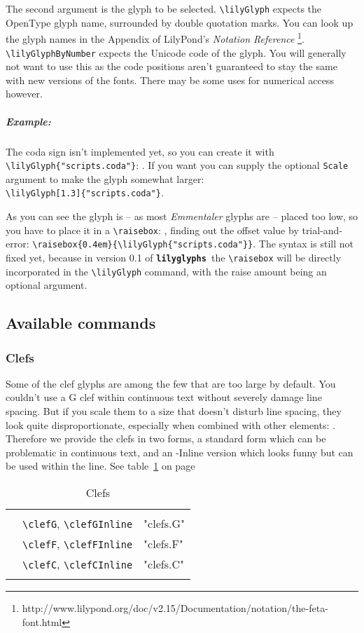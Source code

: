 \documentclass{article}
\newcommand{\lilyglyphs}{\texttt{\textbf{lilyglyphs }}}
\newcommand*{\cmd}[1]{\texttt{\textbackslash #1}}
\newcommand{\tmpCaption}{} %
\newcommand{\tmpLabel}{}
\newenvironment{reftable}[2]
	{%
		\renewcommand{\tmpCaption}{#1}
		\renewcommand{\tmpLabel}{#2}
		\begin{table}[ht]
		\begin{center}
		\begin{tabular}[t]{lll}
		\hline
		&\\
	}
	{%
		&\\
		\hline
		\end{tabular}
		\caption{\tmpCaption}
		\label{table:\tmpLabel}
		\end{center}
		\end{table}
	}
\begin{document}
The second argument is the glyph to be selected. \cmd{lilyGlyph} expects the OpenType glyph name, surrounded by double quotation marks. You can look up the glyph names in the Appendix of LilyPond's \emph{Notation Reference} \footnote{http://www.lilypond.org/doc/v2.15/Documentation/notation/the-feta-font.html}. \cmd{lilyGlyphByNumber} expects the Unicode code of the glyph. You will generally not want to use this as the code positions aren't guaranteed to stay the same with new versions of the fonts. There may be some uses for numerical access however.

\subparagraph*{Example:}
The coda sign isn't implemented yet, so you can create it with \cmd{lilyGlyph\{"scripts.coda"\}}: . If you want you can supply the optional \texttt{Scale} argument to make the glyph somewhat larger: ~\\
\cmd{lilyGlyph[1.3]\{"scripts.coda"\}}.

As you can see the glyph is -- as most \emph{Emmentaler} glyphs are -- placed too low, so you have to place it in a  \cmd{raisebox}: , finding out the offset value by trial-and-error: \cmd{raisebox\{0.4em\}\{\textbackslash lilyGlyph\{"scripts.coda"\}\}}. The syntax is still not fixed yet, because in version 0.1 of \lilyglyphs the \cmd{raisebox} will be directly incorporated in the \cmd{lilyGlyph} command, with the raise amount being an optional argument.


\subsection{Available commands}

\subsubsection{Clefs}
Some of the clef glyphs are among the few that are too large by default. You couldn't use a G clef within continuous text without severely \clefG damage line spacing. But if you scale them to a size that doesn't disturb line spacing, they look quite disproportionate, especially when combined with other elements: \clefCInline \natural. Therefore we provide the clefs in two forms, a standard form which can be problematic in continuous text, and an -Inline version which looks funny but can be used within the line. See table~\ref{table:clefs} on page~\pageref{table:clefs}

\begin{reftable}{Clefs}{clefs}
\clefGInline & \cmd{clefG}, \cmd{clefGInline} & "clefs.G"\\
\clefFInline & \cmd{clefF}, \cmd{clefFInline} & "clefs.F"\\
\clefCInline & \cmd{clefC}, \cmd{clefCInline} & "clefs.C"\\
\end{reftable}
\end{document}
